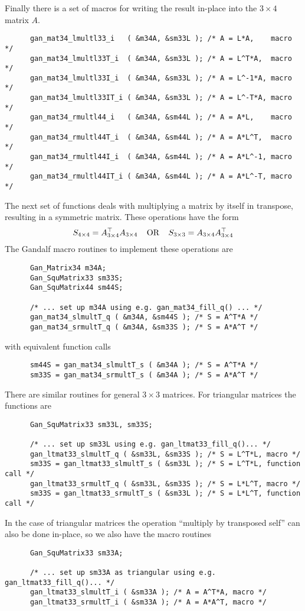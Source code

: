 Finally there is a set of macros for writing the result in-place into
the $3\times 4$ matrix $A$.
\begin{verbatim}
      gan_mat34_lmultl33_i   ( &m34A, &sm33L ); /* A = L*A,    macro */
      gan_mat34_lmultl33T_i  ( &m34A, &sm33L ); /* A = L^T*A,  macro */
      gan_mat34_lmultl33I_i  ( &m34A, &sm33L ); /* A = L^-1*A, macro */
      gan_mat34_lmultl33IT_i ( &m34A, &sm33L ); /* A = L^-T*A, macro */
      gan_mat34_rmultl44_i   ( &m34A, &sm44L ); /* A = A*L,    macro */
      gan_mat34_rmultl44T_i  ( &m34A, &sm44L ); /* A = A*L^T,  macro */
      gan_mat34_rmultl44I_i  ( &m34A, &sm44L ); /* A = A*L^-1, macro */
      gan_mat34_rmultl44IT_i ( &m34A, &sm44L ); /* A = A*L^-T, macro */
\end{verbatim}

The next set of functions deals with multiplying a matrix by itself in
transpose, resulting in a symmetric matrix. These operations have the form
\[ S_{4\times 4} = A_{3\times 4}^{\top} A_{3\times 4}\;\;\;\;\mbox{OR}\;\;\;\;
   S_{3\times 3} = A_{3\times 4} A_{3\times 4}^{\top}
\]
The Gandalf macro routines to implement these operations are
\begin{verbatim}
      Gan_Matrix34 m34A;
      Gan_SquMatrix33 sm33S;
      Gan_SquMatrix44 sm44S;

      /* ... set up m34A using e.g. gan_mat34_fill_q() ... */
      gan_mat34_slmultT_q ( &m34A, &sm44S ); /* S = A^T*A */
      gan_mat34_srmultT_q ( &m34A, &sm33S ); /* S = A*A^T */
\end{verbatim}
with equivalent function calls
\begin{verbatim}
      sm44S = gan_mat34_slmultT_s ( &m34A ); /* S = A^T*A */
      sm33S = gan_mat34_srmultT_s ( &m34A ); /* S = A*A^T */
\end{verbatim}
There are similar routines for general $3\times 3$ matrices. For triangular
matrices the functions are
\begin{verbatim}
      Gan_SquMatrix33 sm33L, sm33S;

      /* ... set up sm33L using e.g. gan_ltmat33_fill_q()... */
      gan_ltmat33_slmultT_q ( &sm33L, &sm33S ); /* S = L^T*L, macro */
      sm33S = gan_ltmat33_slmultT_s ( &sm33L ); /* S = L^T*L, function call */
      gan_ltmat33_srmultT_q ( &sm33L, &sm33S ); /* S = L*L^T, macro */
      sm33S = gan_ltmat33_srmultT_s ( &sm33L ); /* S = L*L^T, function call */
\end{verbatim}
In the case of triangular matrices the operation ``multiply by transposed
self'' can also be done in-place, so we also have the macro routines
\begin{verbatim}
      Gan_SquMatrix33 sm33A;

      /* ... set up sm33A as triangular using e.g. gan_ltmat33_fill_q()... */
      gan_ltmat33_slmultT_i ( &sm33A ); /* A = A^T*A, macro */
      gan_ltmat33_srmultT_i ( &sm33A ); /* A = A*A^T, macro */
\end{verbatim}

